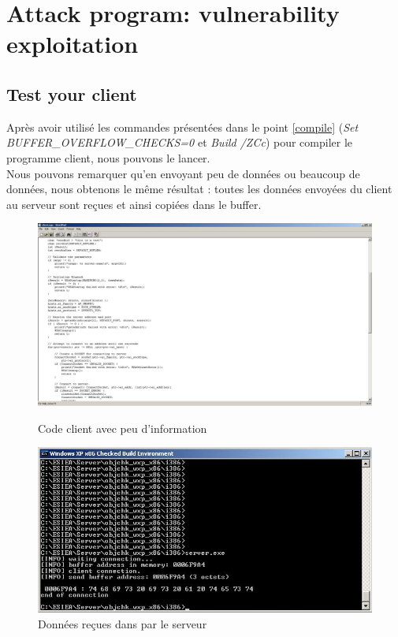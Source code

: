 \section{Attack program: vulnerability exploitation}
\subsection{Test your client}
Après avoir utilisé les commandes présentées dans le point \ref{compile} (\textit{Set BUFFER\_OVERFLOW\_CHECKS=0} et \textit{Build /ZCc}) pour compiler le programme client, nous pouvons le lancer.\\
Nous pouvons remarquer qu'en envoyant peu de données ou beaucoup de données, nous obtenons le même résultat : toutes les données envoyées du client au serveur sont reçues et ainsi copiées dans le buffer.
\begin{figure}[H]
  \centering
  \begin{minipage}{.45\textwidth}
    \centering
    \includegraphics[width=.9\textwidth]{img/51.JPG}
    \captionsetup{justification=centering}
    \caption{Code client avec peu d'information}
  \end{minipage}
  \begin{minipage}{.45\textwidth}
    \includegraphics[width=.9\textwidth]{img/52.JPG}
    \captionsetup{justification=centering}
    \caption{Données reçues dans par le serveur}
  \end{minipage}
\end{figure}

